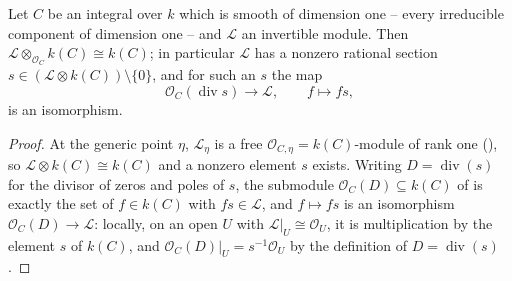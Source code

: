 \begin{lemma}
\label{lem:pcb-line-bundle-rational-section}
Let \(C\) be an integral  over \(k\)
which is smooth of dimension one -- every irreducible component of
dimension one -- and \(\mathcal L\) an invertible module.  Then
\(\mathcal L\otimes_{\mathcal O_C}k(C)\cong k(C)\); in particular
\(\mathcal L\) has a nonzero rational section
\(s\in(\mathcal L\otimes k(C))\setminus\{0\}\), and for such an \(s\)
the map
\[
 \mathcal O_C(\operatorname{div}s)\longrightarrow\mathcal L,
 \qquad f\longmapsto fs,
\]
is an isomorphism.
\end{lemma}
\begin{proof}
At the generic point \(\eta\), \(\mathcal L_\eta\) is a free
\(\mathcal O_{C,\eta}=k(C)\)-module of rank one
(), so
\(\mathcal L\otimes k(C)\cong k(C)\) and a nonzero element \(s\)
exists.  Writing \(D=\operatorname{div}(s)\) for the divisor of
zeros and poles of \(s\), the submodule
\(\mathcal O_C(D)\subseteq k(C)\) of  is exactly
the set of \(f\in k(C)\) with \(fs\in\mathcal L\), and
\(f\mapsto fs\) is an isomorphism \(\mathcal O_C(D)\to\mathcal L\):
locally, on an open \(U\) with \(\mathcal L|_U\cong\mathcal O_U\), it
is multiplication by the element \(s\) of \(k(C)\), and
\(\mathcal O_C(D)|_U=s^{-1}\mathcal O_U\) by the definition of
\(D=\operatorname{div}(s)\).
\end{proof}

